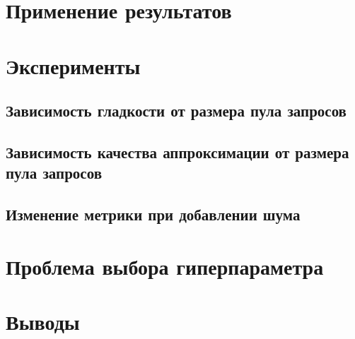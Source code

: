 \documentclass[12pt,a4paper]{amsart}
\theoremstyle{definition}
\theoremstyle{definition}
\begin{document}

\newpage
\section{Применение результатов}


\newpage
\section{Эксперименты}

\subsection{Зависимость гладкости от размера пула запросов}
\pagebreak


\subsection{Зависимость качества аппроксимации от размера пула запросов}
\pagebreak


\subsection{Изменение метрики при добавлении шума}
\pagebreak


\newpage
\section{Проблема выбора гиперпараметра}


\newpage
\section{Выводы}
\end{document}

